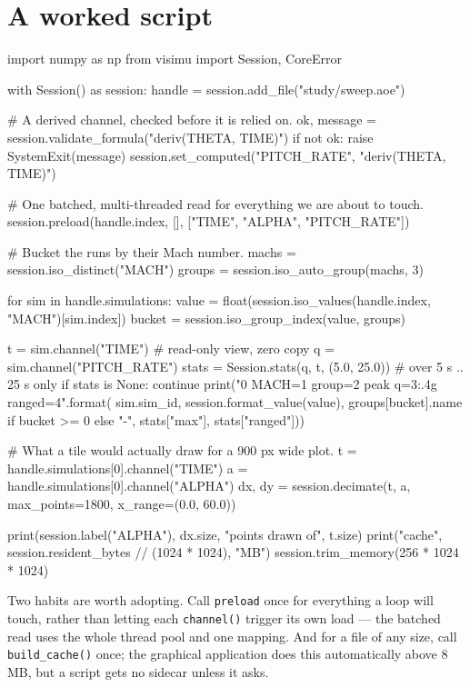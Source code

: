 \documentclass[11pt,a4paper,oneside]{report}
\newcommand{\code}[1]{\texttt{#1}}
\begin{document}
\section{A worked script}

\begin{aoecode}
import numpy as np
from visimu import Session, CoreError

with Session() as session:
    handle = session.add_file("study/sweep.aoe")

    # A derived channel, checked before it is relied on.
    ok, message = session.validate_formula("deriv(THETA, TIME)")
    if not ok:
        raise SystemExit(message)
    session.set_computed("PITCH_RATE", "deriv(THETA, TIME)")

    # One batched, multi-threaded read for everything we are about to touch.
    session.preload(handle.index, [], ["TIME", "ALPHA", "PITCH_RATE"])

    # Bucket the runs by their Mach number.
    machs = session.iso_distinct("MACH")
    groups = session.iso_auto_group(machs, 3)

    for sim in handle.simulations:
        value = float(session.iso_values(handle.index, "MACH")[sim.index])
        bucket = session.iso_group_index(value, groups)

        t = sim.channel("TIME")           # read-only view, zero copy
        q = sim.channel("PITCH_RATE")
        stats = Session.stats(q, t, (5.0, 25.0))   # over 5 s .. 25 s only
        if stats is None:
            continue
        print("{0} MACH={1} group={2} peak q={3:.4g} ranged={4}".format(
            sim.sim_id, session.format_value(value),
            groups[bucket].name if bucket >= 0 else "-",
            stats["max"], stats["ranged"]))

    # What a tile would actually draw for a 900 px wide plot.
    t = handle.simulations[0].channel("TIME")
    a = handle.simulations[0].channel("ALPHA")
    dx, dy = session.decimate(t, a, max_points=1800, x_range=(0.0, 60.0))

    print(session.label("ALPHA"), dx.size, "points drawn of", t.size)
    print("cache", session.resident_bytes // (1024 * 1024), "MB")
    session.trim_memory(256 * 1024 * 1024)
\end{aoecode}

Two habits are worth adopting. Call \code{preload} once for everything a loop
will touch, rather than letting each \code{channel()} trigger its own load ---
the batched read uses the whole thread pool and one mapping. And for a file of
any size, call \code{build\_cache()} once; the graphical application does this
automatically above 8\,MB, but a script gets no sidecar unless it asks.
\end{document}
